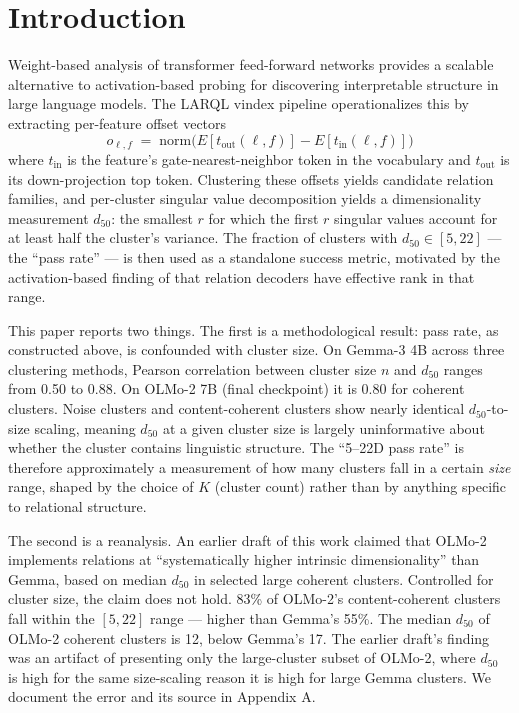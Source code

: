 \documentclass[11pt,letterpaper]{article}
\begin{document}
\section{Introduction}

Weight-based analysis of transformer feed-forward networks \citep{geva2021transformer, geva2022transformer} provides a scalable alternative to activation-based probing for discovering interpretable structure in large language models. The LARQL vindex pipeline \citep{hayuk2026} operationalizes this by extracting per-feature offset vectors
\[
o_{\ell, f} \;=\; \mathrm{norm}\big(E[t_{\mathrm{out}}(\ell,f)] - E[t_{\mathrm{in}}(\ell,f)]\big)
\]
where $t_{\mathrm{in}}$ is the feature's gate-nearest-neighbor token in the vocabulary and $t_{\mathrm{out}}$ is its down-projection top token. Clustering these offsets yields candidate relation families, and per-cluster singular value decomposition yields a dimensionality measurement $d_{50}$: the smallest $r$ for which the first $r$ singular values account for at least half the cluster's variance. The fraction of clusters with $d_{50} \in [5, 22]$ --- the ``pass rate'' --- is then used as a standalone success metric, motivated by the activation-based finding of \citet{hernandez2024linearity} that relation decoders have effective rank in that range.

This paper reports two things. The first is a methodological result: pass rate, as constructed above, is confounded with cluster size. On Gemma-3 4B across three clustering methods, Pearson correlation between cluster size $n$ and $d_{50}$ ranges from 0.50 to 0.88. On OLMo-2 7B (final checkpoint) it is 0.80 for coherent clusters. Noise clusters and content-coherent clusters show nearly identical $d_{50}$-to-size scaling, meaning $d_{50}$ at a given cluster size is largely uninformative about whether the cluster contains linguistic structure. The ``5--22D pass rate'' is therefore approximately a measurement of how many clusters fall in a certain \emph{size} range, shaped by the choice of $K$ (cluster count) rather than by anything specific to relational structure.

The second is a reanalysis. An earlier draft of this work \citep[see Appendix A]{} claimed that OLMo-2 implements relations at ``systematically higher intrinsic dimensionality'' than Gemma, based on median $d_{50}$ in selected large coherent clusters. Controlled for cluster size, the claim does not hold. 83\% of OLMo-2's content-coherent clusters fall within the $[5, 22]$ range --- higher than Gemma's 55\%. The median $d_{50}$ of OLMo-2 coherent clusters is 12, below Gemma's 17. The earlier draft's finding was an artifact of presenting only the large-cluster subset of OLMo-2, where $d_{50}$ is high for the same size-scaling reason it is high for large Gemma clusters. We document the error and its source in Appendix A.
\end{document}
